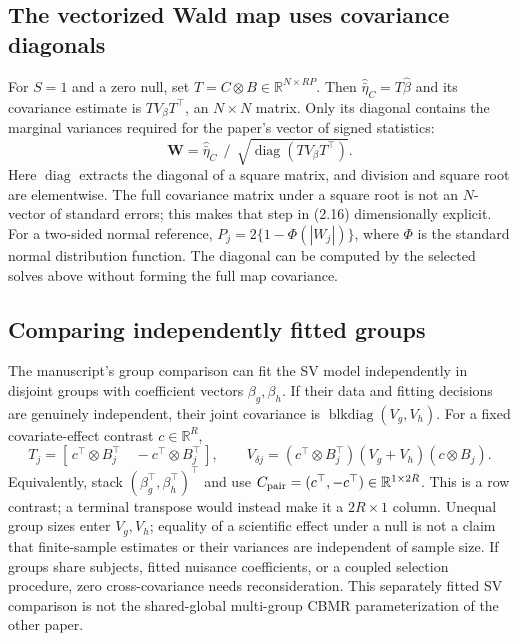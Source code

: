 \documentclass[11pt,a4paper]{article}
\newcommand{\R}{\mathbb R}
\newcommand{\diag}{\operatorname{diag}}
\numberwithin{equation}{section}
\begin{document}
\subsection{The vectorized Wald map uses covariance diagonals}
For $S=1$ and a zero null, set $T=C\otimes B\in\R^{N\times RP}$.
Then $\widehat{\bar\eta}_C=T\widehat\beta$ and its covariance
estimate is $TV_\beta T^\top$, an $N\times N$ matrix.
Only its diagonal contains the marginal variances required for
the paper's vector of signed statistics:
\[
 \mathbf W=
 \widehat{\bar\eta}_C\ \mathbin{/}\
 \sqrt{\diag(TV_\beta T^\top)}.
\]
Here $\diag$ extracts the diagonal of a square matrix, and
division and square root are elementwise. The full covariance
matrix under a square root is not an $N$-vector of standard
errors; this makes that step in (2.16) dimensionally explicit.
For a two-sided normal reference, $P_j=2\{1-\Phi(|W_j|)\}$,
where $\Phi$ is the standard normal distribution function.
The diagonal can be computed by the selected solves above
without forming the full map covariance.

\subsection{Comparing independently fitted groups}
The manuscript's group comparison can fit the SV model independently
in disjoint groups with coefficient vectors $\beta_g,\beta_h$.
If their data and fitting decisions are genuinely independent,
their joint covariance is $\operatorname{blkdiag}(V_g,V_h)$.
For a fixed covariate-effect contrast $c\in\R^R$,
\[
 T_j=[\,c^\top\otimes B_j^\top\quad
                  -c^\top\otimes B_j^\top\,],\qquad
 V_{\delta j}=(c^\top\otimes B_j^\top)(V_g+V_h)(c\otimes B_j).
\]
Equivalently, stack $(\beta_g^\top,\beta_h^\top)^\top$ and use
$C_{\rm pair}=(c^\top,-c^\top)\in\R^{1\times2R}$.
This is a row contrast; a terminal transpose would instead make
it a $2R\times1$ column.
Unequal group sizes enter $V_g,V_h$; equality of a scientific
effect under a null is not a claim that finite-sample estimates or
their variances are independent of sample size.
If groups share subjects, fitted nuisance coefficients, or a coupled
selection procedure, zero cross-covariance needs reconsideration.
This separately fitted SV comparison is not the shared-global
multi-group CBMR parameterization of the other paper.
\end{document}
